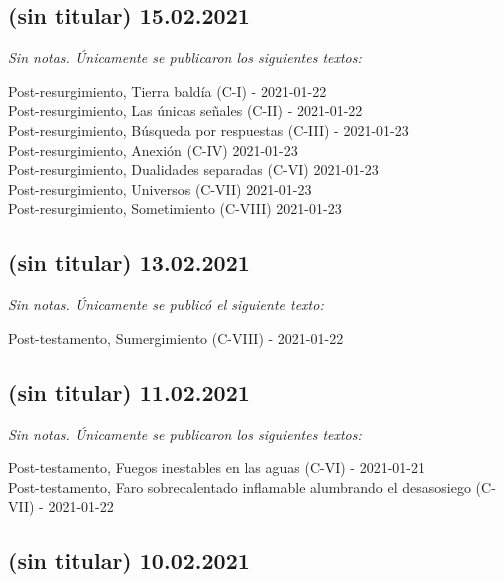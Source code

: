 \documentclass[
]{book}
\begin{document}
\hypertarget{sin-titular-15.02.2021}{%
\subsection*{(sin titular) 15.02.2021}\label{sin-titular-15.02.2021}}

\emph{Sin notas. Únicamente se publicaron los siguientes textos:}

Post-resurgimiento, Tierra baldía (C-I) - 2021-01-22~\\
Post-resurgimiento, Las únicas señales (C-II) - 2021-01-22~\\
Post-resurgimiento, Búsqueda por respuestas (C-III) - 2021-01-23~\\
Post-resurgimiento, Anexión (C-IV) 2021-01-23~\\
Post-resurgimiento, Dualidades separadas (C-VI) 2021-01-23~\\
Post-resurgimiento, Universos (C-VII) 2021-01-23~\\
Post-resurgimiento, Sometimiento (C-VIII) 2021-01-23

\hypertarget{sin-titular-13.02.2021}{%
\subsection*{(sin titular) 13.02.2021}\label{sin-titular-13.02.2021}}

\emph{Sin notas. Únicamente se publicó el siguiente texto:}

Post-testamento, Sumergimiento (C-VIII) - 2021-01-22

\hypertarget{sin-titular-11.02.2021}{%
\subsection*{(sin titular) 11.02.2021}\label{sin-titular-11.02.2021}}

\emph{Sin notas. Únicamente se publicaron los siguientes textos:}

Post-testamento, Fuegos inestables en las aguas (C-VI) - 2021-01-21~\\
Post-testamento, Faro sobrecalentado inflamable alumbrando el desasosiego (C-VII) - 2021-01-22

\hypertarget{sin-titular-10.02.2021}{%
\subsection*{(sin titular) 10.02.2021}\label{sin-titular-10.02.2021}}
\end{document}
